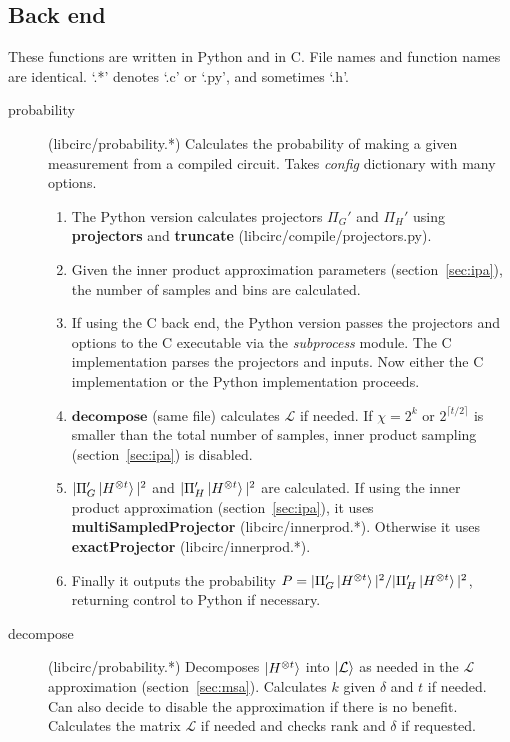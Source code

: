 \documentclass[11pt]{article}
\begin{document}
\subsection{Back end}
These functions are written in Python and in C. File names and function names are identical. `.*' denotes `.c' or `.py', and sometimes `.h'.

\begin{description}
    \item[probability] (libcirc/probability.*) Calculates the probability of making a given measurement from a compiled circuit. Takes \textit{config} dictionary with many options.
    \begin{enumerate}
        \setlength{\itemsep}{1pt}
        \item The Python version calculates projectors $\Pi_G'$ and $\Pi_H'$ using \textbf{projectors} and \textbf{truncate} (libcirc/compile/projectors.py).
        \item Given the inner product approximation parameters (section~\ref{sec:ipa}), the number of samples and bins are calculated.
        \item If using the C back end, the Python version passes the projectors and options to the C executable via the \textit{subprocess} module. The C implementation parses the projectors and inputs. Now either the C implementation or the Python implementation proceeds.
        \item $\textbf{decompose}$ (same file) calculates $\mathcal{L}$ if needed. If $\chi = 2^k$ or $2^{\lceil t/2 \rceil}$ is smaller than the total number of samples, inner product sampling (section~\ref{sec:ipa}) is disabled.
            \item $|\Pi_G'\ket{H^{\otimes t}}|^2$ and $|\Pi_H'\ket{H^{\otimes t}}|^2$ are calculated. If using the inner product approximation (section~\ref{sec:ipa}), it uses \textbf{multiSampledProjector} (libcirc/innerprod.*). Otherwise it uses \textbf{exactProjector} (libcirc/innerprod.*).
        \item Finally it outputs the probability $P = |\Pi_G'\ket{H^{\otimes t}}|^2 / |\Pi_H'\ket{H^{\otimes t}}|^2$, returning control to Python if necessary.
    \end{enumerate}
    \item[decompose] (libcirc/probability.*) Decomposes $\ket{H^{\otimes t}}$ into $\ket{\mathcal{L}}$ as needed in the $\mathcal{L}$ approximation (section~\ref{sec:msa}). Calculates $k$ given $\delta$ and $t$ if needed. Can also decide to disable the approximation if there is no benefit. Calculates the matrix $\mathcal{L}$ if needed and checks rank and $\delta$ if requested.

\end{description}
\end{document}
